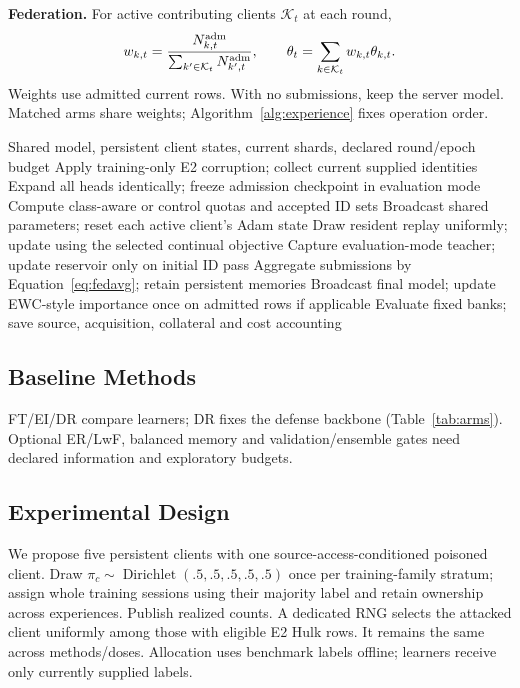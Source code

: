 \documentclass[10pt,a4paper]{article}
\begin{document}
\textbf{Federation.} For active contributing clients $\mathcal K_t$ at each round,
\begin{equation}
w_{k,t}=\frac{N^{\rm adm}_{k,t}}{\sum_{k'\in\mathcal K_t}N^{\rm adm}_{k',t}},\qquad
\theta_t=\sum_{k\in\mathcal K_t}w_{k,t}\theta_{k,t}.
\label{eq:fedavg}
\end{equation}
Weights use admitted current rows. With no submissions, keep the server model. Matched arms share weights; Algorithm~\ref{alg:experience} fixes operation order.

\begin{algorithm}[htbp]
\caption{One proposed supervised experience}
\label{alg:experience}
\begin{algorithmic}[1]
\Require Shared model, persistent client states, current shards, declared round/epoch budget
\State Apply training-only E2 corruption; collect current supplied identities
\State Expand all heads identically; freeze admission checkpoint in evaluation mode
\State Compute class-aware or control quotas and accepted ID sets
\State Broadcast shared parameters; reset each active client's Adam state
\State Draw resident replay uniformly; update using the selected continual objective
\State Capture evaluation-mode teacher; update reservoir only on initial ID pass
\EndFor
\State Aggregate submissions by Equation~\eqref{eq:fedavg}; retain persistent memories
\EndFor
\State Broadcast final model; update EWC-style importance once on admitted rows if applicable
\State Evaluate fixed banks; save source, acquisition, collateral and cost accounting
\end{algorithmic}
\end{algorithm}
\subsection{Baseline Methods}
FT/EI/DR compare learners; DR fixes the defense backbone (Table~\ref{tab:arms}). Optional ER/LwF, balanced memory and validation/ensemble gates need declared information and exploratory budgets.

\subsection{Experimental Design}
We propose five persistent clients with one source-access-conditioned poisoned client. Draw $\pi_c\sim\operatorname{Dirichlet}(.5,.5,.5,.5,.5)$ once per training-family stratum; assign whole training sessions using their majority label and retain ownership across experiences. Publish realized counts. A dedicated RNG selects the attacked client uniformly among those with eligible E2 Hulk rows. It remains the same across methods/doses. Allocation uses benchmark labels offline; learners receive only currently supplied labels.
\end{document}
